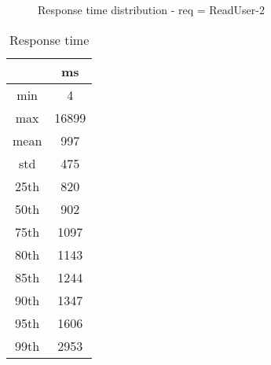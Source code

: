 \begin{minipage}{0.75\linewidth}
\begin{figure}[h]
\begin{adjustbox}{max width=1.0\linewidth, keepaspectratio}
\begin{tikzpicture}
      \end{tikzpicture}
  \end{adjustbox}
  \caption{Response time distribution - req = ReadUser-2}
\end{figure}
\end{minipage}\hfill\begin{minipage}{0.18\linewidth}
\begin{table}[h]
\begin{tabular}{|cc|}
\hline
\textbf{} & \textbf{ms}\\ \hline
 \Xhline{0.005\arrayrulewidth}
min & 4\\
 \Xhline{0.005\arrayrulewidth}
max & 16899\\
 \Xhline{0.005\arrayrulewidth}
mean & 997\\
 \Xhline{0.005\arrayrulewidth}
std & 475\\
\hline
\hline
 \Xhline{0.005\arrayrulewidth}
25th & 820\\
 \Xhline{0.005\arrayrulewidth}
50th & 902\\
 \Xhline{0.005\arrayrulewidth}
75th & 1097\\
 \Xhline{0.005\arrayrulewidth}
80th & 1143\\
 \Xhline{0.005\arrayrulewidth}
85th & 1244\\
 \Xhline{0.005\arrayrulewidth}
90th & 1347\\
 \Xhline{0.005\arrayrulewidth}
95th & 1606\\
 \Xhline{0.005\arrayrulewidth}
99th & 2953\\
\hline
\end{tabular}
\caption{Response time}
\end{table}
\end{minipage}\hfill